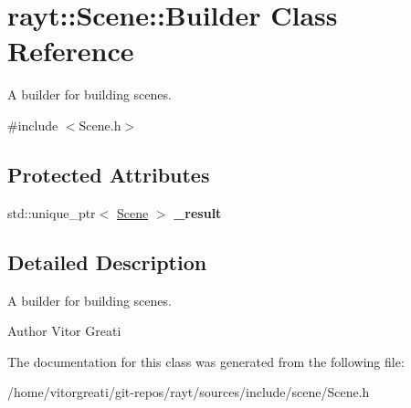 \hypertarget{classrayt_1_1_scene_1_1_builder}{}\section{rayt\+::Scene\+::Builder Class Reference}
\label{classrayt_1_1_scene_1_1_builder}


A builder for building scenes.  




{\ttfamily \#include $<$Scene.\+h$>$}

\subsection*{Protected Attributes}
\begin{DoxyCompactItemize}
\item 
\mbox{\label{classrayt_1_1_scene_1_1_builder_a0e75c5197cd8a99097169570c575bb35}} 
std\+::unique\+\_\+ptr$<$ \mbox{\hyperlink{classrayt_1_1_scene}{Scene}} $>$ {\bfseries \+\_\+result}
\end{DoxyCompactItemize}


\subsection{Detailed Description}
A builder for building scenes. 

\begin{DoxyAuthor}{Author}
Vitor Greati 
\end{DoxyAuthor}


The documentation for this class was generated from the following file\+:\begin{DoxyCompactItemize}
\item 
/home/vitorgreati/git-\/repos/rayt/sources/include/scene/Scene.\+h\end{DoxyCompactItemize}
